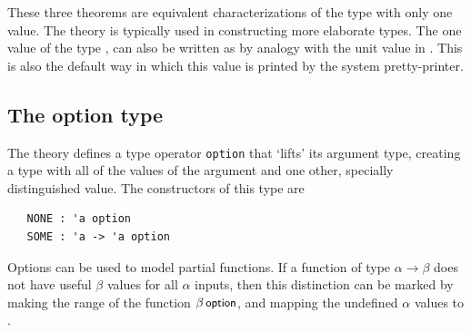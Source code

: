 \noindent These three theorems are equivalent characterizations of the type
with only one value. The theory  is typically used in
constructing more elaborate types.  The one value of the type
, can also be written as \ml{()} by analogy with the unit
value in \ML.  This is also the default way in which this value is
printed by the system pretty-printer.

\subsection{The option type}

The theory  defines a type operator \verb+option+
that `lifts' its argument type, creating a type with all of the
values of the argument and one other, specially distinguished value.
The constructors of this type are
\begin{hol}
\begin{verbatim}
   NONE : 'a option
   SOME : 'a -> 'a option
\end{verbatim}
\end{hol}
Options can be used to model partial functions.  If a function of type
$\alpha\rightarrow\beta$ does not have useful $\beta$ values for all
$\alpha$ inputs, then this distinction can be marked by making the
range of the function $\beta\,\mbox{\small{\textbf{\sf{option}}}}$, and mapping the
undefined $\alpha$ values to .

